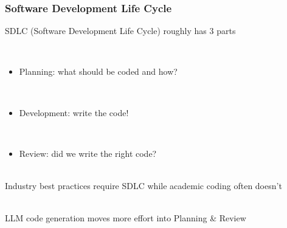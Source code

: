 \documentclass{beamer}
\begin{document}

\begin{frame}
\begin{center}
\frametitle{Software Development Life Cycle}

SDLC (Software Development Life Cycle) roughly has 3 parts

~\\

\begin{itemize}

\item Planning: what should be coded and how?

~\\

\item Development: write the code!

~\\

\item Review: did we write the right code?

\end{itemize}

~\\

Industry best practices require SDLC while academic coding often doesn't

~\\

LLM code generation moves more effort into Planning \& Review

\end{center}
\end{frame}

\end{document}
